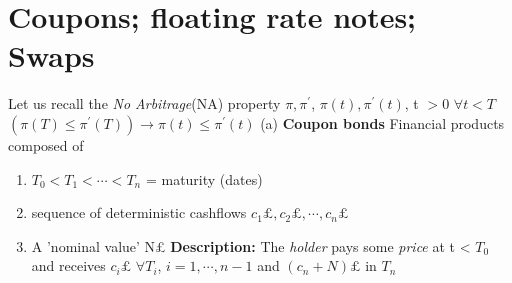 \section{Coupons; floating rate notes; Swaps}
\begin{rem}
Let us recall the \textit{No Arbitrage}(NA) property $\pi, \pi^{'}$, $\pi(t), \pi^{'}(t)$,
t $>$0 $\forall t \lt T$ 
\newline $(\pi(T) \leq \pi^{'}(T)) \longrightarrow \pi(t) \leq \pi^{'}(t) $
(a) \textbf{Coupon bonds} Financial products composed of 
\begin{enumerate} 
 \item $T_0 \lt T_1 \lt \cdots \lt T_n$ = maturity (dates)
\item sequence of deterministic cashflows $c_1 \pounds, c_2 \pounds, \cdots , c_n \pounds$
\item A 'nominal value' N\pounds 
\newline \textbf{Description:} The \textit{holder} pays some \textit{price} at t < $T_0$ and receives $c_i\pounds$ 
$\forall
T_i$, $i=1,\cdots, n-1$ and $(c_n + N)\pounds$ in $T_n$
\end{enumerate}
\end{rem}
